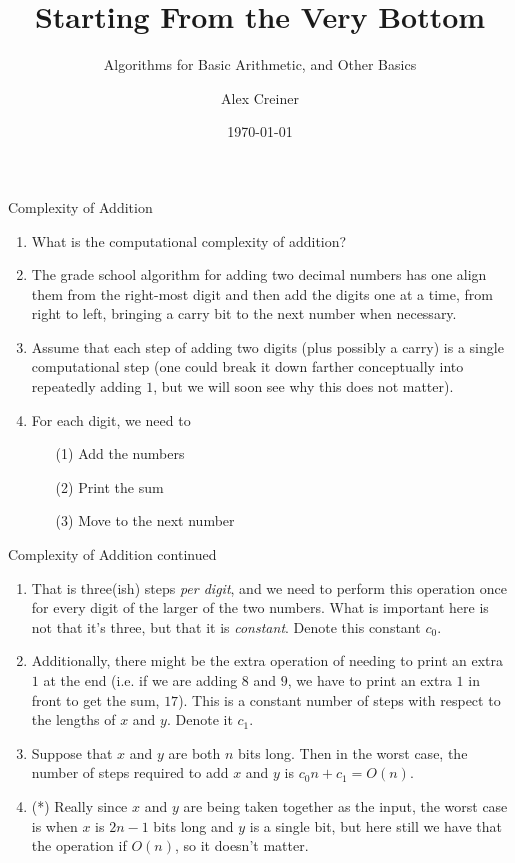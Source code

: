 \documentclass{beamer}
\title{Starting From the Very Bottom}
\subtitle{Algorithms for Basic Arithmetic, and Other Basics}
\author{Alex Creiner}
\institute{Boston College}
\date{\today}
\begin{document}
\titlepage

\begin{frame}{Complexity of Addition}
    \begin{enumerate}
        \item What is the computational complexity of addition?
            \pause
        \item The grade school algorithm for adding two decimal numbers has one align them from the right-most digit and then add the digits one at a time, from right to left, bringing a carry bit to the next number when necessary. 
        \item Assume that each step of adding two digits (plus possibly a carry) is a single computational step (one could break it down farther conceptually into repeatedly adding $1$, but we will soon see why this does not matter).
            \pause 
        \item For each digit, we need to 
            \begin{itemize}
                \item[(1)] Add the numbers
                \item[(2)] Print the sum
                \item[(3)] Move to the next number
            \end{itemize}
    \end{enumerate}
\end{frame}

\begin{frame}{Complexity of Addition continued}
    \begin{enumerate}
        \item That is three(ish) steps \textit{per digit}, and we need to perform this operation once for every digit of the larger of the two numbers. What is important here is not that it's three, but that it is \textit{constant}. Denote this constant $c_0$.
            \pause 
        \item Additionally, there might be the extra operation of needing to print an extra $1$ at the end (i.e. if we are adding $8$ and $9$, we have to print an extra $1$ in front to get the sum, $17$). This is a constant number of steps with respect to the lengths of $x$ and $y$. Denote it $c_1$.
        \item Suppose that $x$ and $y$ are both $n$ bits long. Then in the worst case, the number of steps required to add $x$ and $y$ is $c_0n + c_1 = O(n)$.
            \pause
        \item (*) Really since $x$ and $y$ are being taken together as the input, the worst case is when $x$ is $2n-1$ bits long and $y$ is a single bit, but here still we have that the operation if $O(n)$, so it doesn't matter. 
    \end{enumerate}
\end{frame}
\end{document}
